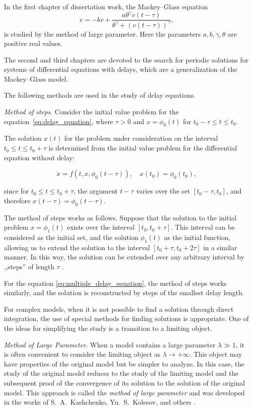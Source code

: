 In the first chapter of dissertation work, the Mackey--Glass equation \cite{Mackey1977, Glass1988}
\begin{equation}
	\label{eq:mg_equation_1:intro}
	\dot{v}=-b v+\frac{a \theta^{\gamma} v(t-\tau)}{\theta^{\gamma}+(v(t-\tau))^{\gamma}},
\end{equation}
is studied by the method of large parameter. Here the parameters $a, b, \gamma, \theta$ are positive real values.

The second and third chapters are devoted to the search for periodic solutions for systems of differential equations with delays, which are a generalization of the Mackey--Glass model.

{\methods} The following methods are used in the study of delay equations.

\textit{Method of steps}. Consider the initial value problem for the equation~\eqref{eq:delay_equation}, where $\tau > 0$ and $x = \phi_0(t)$ for $t_0 - \tau \leq t \leq t_0$.

The solution $x(t)$ for the problem under consideration on the interval $t_0 \leq t \leq t_0 + \tau$ is determined from the initial value problem for the differential equation without delay:

\[
\dot{x} = f(t, x, \phi_0(t - \tau)), \quad x(t_0) = \phi_0(t_0),
\]

since for $t_0 \leq t \leq t_0 + \tau$, the argument $t - \tau$ varies over the set $[t_0 - \tau, t_0]$, and therefore $x(t - \tau) = \phi_0(t - \tau)$.

The method of steps works as follows. Suppose that the solution to the initial problem $x = \phi_1(t)$ exists over the interval $[t_0, t_0 + \tau]$. This interval can be considered as the initial set, and the solution $\phi_1(t)$ as the initial function, allowing us to extend the solution to the interval $[t_0 + \tau, t_0 + 2\tau]$ in a similar manner. In this way, the solution can be extended over any arbitrary interval by ,,steps'' of length $\tau$ \cite{Elsholtz1971}.

For the equation \eqref{eq:multiple_delay_equation}, the method of steps works similarly, and the solution is reconstructed by steps of the smallest delay length.

For complex models, when it is not possible to find a solution through direct integration, the use of special methods for finding solutions is appropriate. One of the ideas for simplifying the study is a transition to a limiting object.

\textit{Method of Large Parameter}. When a model contains a large parameter $\lambda \gg 1$, it is often convenient to consider the limiting object as $\lambda \to +\infty$. This object may have properties of the original model but be simpler to analyze. In this case, the study of the original model reduces to the study of the limiting model and the subsequent proof of the convergence of its solution to the solution of the original model. This approach is called the \textit{method of large parameter} and was developed in the works of S.~A.~Kashchenko, Yu.~S.~Kolesov, and others \cite{Kashchenko1982, Kashchenko1983, KolesovKolesov1993, Kolesov2010}.

